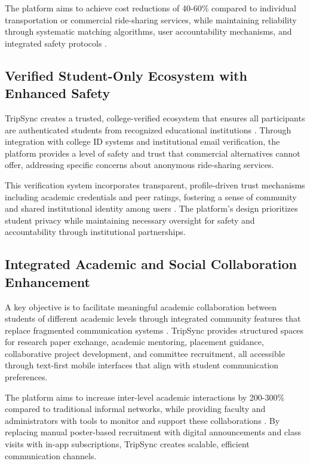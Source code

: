 \documentclass[conference]{IEEEtran}
\begin{document}
The platform aims to achieve cost reductions of 40-60\% compared to individual transportation or commercial ride-sharing services, while maintaining reliability through systematic matching algorithms, user accountability mechanisms, and integrated safety protocols \cite{ref8}\cite{ref9}.

\subsection{Verified Student-Only Ecosystem with Enhanced Safety}

TripSync creates a trusted, college-verified ecosystem that ensures all participants are authenticated students from recognized educational institutions \cite{ref10}\cite{ref11}. Through integration with college ID systems and institutional email verification, the platform provides a level of safety and trust that commercial alternatives cannot offer, addressing specific concerns about anonymous ride-sharing services.

This verification system incorporates transparent, profile-driven trust mechanisms including academic credentials and peer ratings, fostering a sense of community and shared institutional identity among users \cite{ref12}\cite{ref13}. The platform's design prioritizes student privacy while maintaining necessary oversight for safety and accountability through institutional partnerships.

\subsection{Integrated Academic and Social Collaboration Enhancement}

A key objective is to facilitate meaningful academic collaboration between students of different academic levels through integrated community features that replace fragmented communication systems \cite{ref14}\cite{ref15}. TripSync provides structured spaces for research paper exchange, academic mentoring, placement guidance, collaborative project development, and committee recruitment, all accessible through text-first mobile interfaces that align with student communication preferences.

The platform aims to increase inter-level academic interactions by 200-300\% compared to traditional informal networks, while providing faculty and administrators with tools to monitor and support these collaborations \cite{ref16}\cite{ref17}. By replacing manual poster-based recruitment with digital announcements and class visits with in-app subscriptions, TripSync creates scalable, efficient communication channels.
\end{document}
